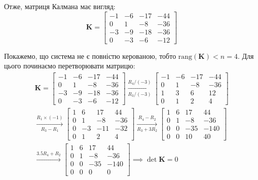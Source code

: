 \documentclass[oneside,solution]{karazin-control-assign}
\begin{document}
Отже, матриця Калмана має вигляд:
\begin{equation}
    \boldsymbol{K} = \begin{bmatrix}
        -1 & -6 & -17 & -44\\
        0  & 1 & -8 & -36\\
        -3 & -9 & -18 & -36\\
        0 & -3 & -6 & -12
    \end{bmatrix}
\end{equation}

Покажемо, що система не є повністю керованою, тобто $\text{rang}(\boldsymbol{K}) < n=4$. Для цього починаємо перетворювати матрицю:
\begin{gather}
    \boldsymbol{K} = \begin{bmatrix}
        -1 & -6 & -17 & -44 \\
        0  & 1 & -8 & -36 \\
        -3 & -9 & -18 & -36 \\
        0 & -3 & -6 & -12
    \end{bmatrix} \xrightarrow[R_3/(-3)]{R_4/(-3)} \begin{bmatrix}
        -1 & -6 & -17 & -44 \\
        0  & 1 & -8 & -36 \\
        1 & 3 & 6 & 12 \\
        0 & 1 & 2 & 4
    \end{bmatrix} \nonumber \\
    \xrightarrow[R_3-R_1]{R_1 \times (-1)} \begin{bmatrix}
        1 & 6 & 17 & 44 \\
        0  & 1 & -8 & -36 \\
        0 & -3 & -11 & -32 \\
        0 & 1 & 2 & 4
    \end{bmatrix} \xrightarrow[R_3+3R_2]{R_4-R_2} \begin{bmatrix}
        1 & 6 & 17 & 44 \\
        0  & 1 & -8 & -36 \\
        0 & 0 & -35 & -140 \\
        0 & 0 & 10 & 40
    \end{bmatrix} \nonumber \\
    \xrightarrow[]{3.5R_4+R_2} \begin{bmatrix}
        1 & 6 & 17 & 44 \\
        0  & 1 & -8 & -36 \\
        0 & 0 & -35 & -140 \\
        0 & 0 & 0 & 0
    \end{bmatrix} \implies \det \boldsymbol{K} = 0
\end{gather}
\end{document}
